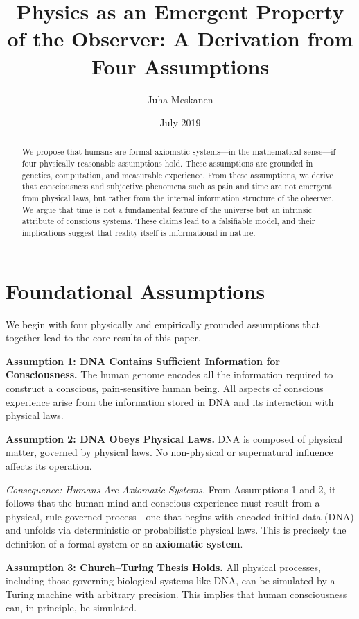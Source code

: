 \documentclass[11pt]{article}
\title{Physics as an Emergent Property of the Observer: A Derivation from Four Assumptions}
\author{Juha Meskanen}
\date{July 2019}
\begin{document}
\maketitle

\begin{abstract}
  We propose that humans are formal axiomatic systems—in the mathematical sense—if four physically reasonable assumptions hold. These assumptions are grounded in genetics, computation, and measurable experience. From these assumptions, we derive that consciousness and subjective phenomena such as pain and time are not emergent from physical laws, but rather from the internal information structure of the observer. We argue that time is not a fundamental feature of the universe but an intrinsic attribute of conscious systems. These claims lead to a falsifiable model, and their implications suggest that reality itself is informational in nature.
\end{abstract}

\section{Foundational Assumptions}

We begin with four physically and empirically grounded assumptions that together lead to the core results of this paper.

\textbf{Assumption 1: DNA Contains Sufficient Information for Consciousness.}
The human genome encodes all the information required to construct a conscious, pain-sensitive human being. All aspects of conscious experience arise from the information stored in DNA and its interaction with physical laws.

\textbf{Assumption 2: DNA Obeys Physical Laws.}
DNA is composed of physical matter, governed by  physical laws. No non-physical or supernatural influence affects its operation.

\vspace{0.5em}
\textit{Consequence: Humans Are Axiomatic Systems.}
From Assumptions 1 and 2, it follows that the human mind and conscious experience must result from a physical, rule-governed process—one that begins with encoded initial data (DNA) and unfolds via deterministic or probabilistic physical laws. This is precisely the definition of a formal system or an \textbf{axiomatic system}.

\vspace{0.5em}
\textbf{Assumption 3: Church–Turing Thesis Holds.}
All physical processes, including those governing biological systems like DNA, can be simulated by a Turing machine with arbitrary precision. This implies that human consciousness can, in principle, be simulated.
\end{document}
